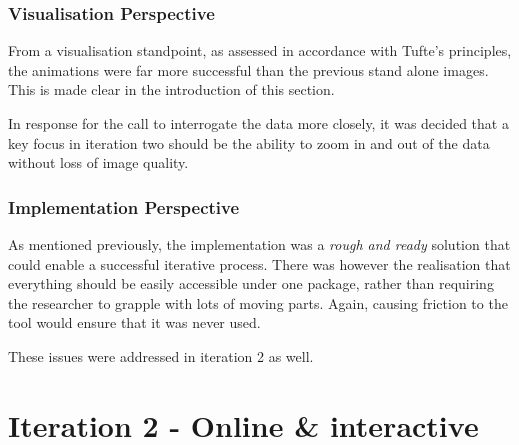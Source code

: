 \documentclass[a4paper,11pt,titlepage]{article}
\begin{document}
		\subsubsection{Visualisation Perspective}
		From a visualisation standpoint, as assessed in accordance with Tufte's principles, the animations were far more successful than the previous stand alone images. This is made clear in the introduction of this section.
		\par 
		In response for the call to interrogate the data more closely, it was decided that a key focus in iteration two should be the ability to zoom in and out of the data without loss of image quality.
		
		\subsubsection{Implementation Perspective}	
		As mentioned previously, the implementation was a \textit{rough and ready} solution that could enable a successful iterative process. There was however the realisation that everything should be easily accessible under one package, rather than requiring the researcher to grapple with lots of moving parts. Again, causing friction to the tool would ensure that it was never used. 
		\par 
		These issues were addressed in iteration 2 as well.
		
\clearpage 

\section{Iteration 2 - Online \& interactive}
\end{document}

